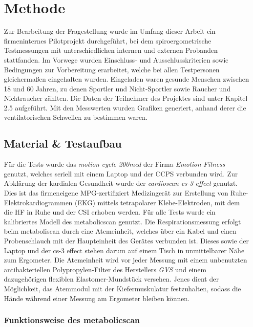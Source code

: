\chapter{Methode}

Zur Bearbeitung der Fragestellung wurde im Umfang dieser Arbeit ein firmeninternes Pilotprojekt durchgeführt, bei dem spiroergometrische Testmessungen mit unterschiedlichen internen und externen Probanden stattfanden. Im Vorwege wurden Einschluss- und Ausschlusskriterien sowie Bedingungen zur Vorbereitung erarbeitet, welche bei allen Testpersonen gleichermaßen eingehalten wurden. Eingeladen waren gesunde Menschen zwischen 18 und 60 Jahren, zu denen Sportler und Nicht-Sportler sowie Raucher und Nichtraucher zählten. Die Daten der Teilnehmer des Projektes sind unter Kapitel 2.5 aufgeführt. Mit den Messwerten wurden Grafiken generiert, anhand derer die ventilatorischen Schwellen zu bestimmen waren.

\section{Material \& Testaufbau}

Für die Tests wurde das \textsl{motion cycle 200med} der Firma \textsl{Emotion Fitness} genutzt, welches seriell mit einem Laptop und der \acs{CCPS} verbunden wird. Zur Abklärung der kardialen Gesundheit wurde der \textsl{cardioscan cs-3 effect} genutzt. Dies ist das firmeneigene MPG-zertifiziert Medizingerät zur Erstellung von Ruhe-Elektrokardiogrammen (\acs{EKG}) mittels tetrapolarer Klebe-Elektroden, mit dem die \ac{HF} in Ruhe und der \ac{CSI} erhoben werden. Für alle Tests wurde ein kalibriertes Modell des metabolicscan genutzt. Die Respirationsmessung erfolgt beim metaboliscan durch eine Atemeinheit, welches über ein Kabel und einen Probenschlauch mit der Haupteinheit des Gerätes verbunden ist. Dieses sowie der Laptop und der cs-3 effect stehen darum auf einem Tisch in unmittelbarer Nähe zum Ergometer. Die Atemeinheit wird vor jeder Messung mit einem unbenutzten antibakteriellen Polypropylen-Filter des Herstellers \textsl{GVS} und einem dazugehörigen flexiblen Elastomer-Mundstück versehen. Jenes dient der Möglichkeit, das Atemmodul mit der Kiefermuskulatur festzuhalten, sodass die Hände während einer Messung am Ergometer bleiben können.

\subsection{Funktionsweise des metabolicscan}

